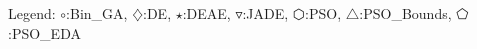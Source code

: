 Legend: {\color{NavyBlue}$\circ$}:Bin\_GA, {\color{Magenta}$\diamondsuit$}:DE, {\color{Orange}$\star$}:DEAE, {\color{CornflowerBlue}$\triangledown$}:JADE, {\color{red}$\varhexagon$}:PSO, {\color{YellowGreen}$\triangle$}:PSO\_Bounds, {\color{cyan}$\pentagon$}:PSO\_EDA